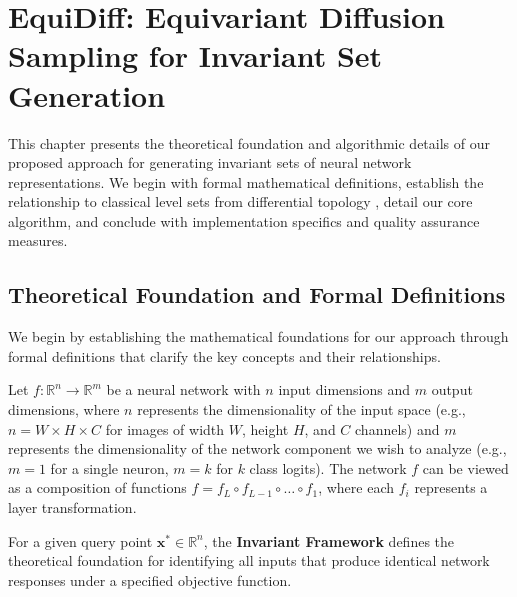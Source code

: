 \chapter{EquiDiff: Equivariant Diffusion Sampling for Invariant Set Generation}\label{r:method}

This chapter presents the theoretical foundation and algorithmic details of our proposed approach for generating invariant sets of neural network representations. We begin with formal mathematical definitions, establish the relationship to classical level sets from differential topology \citep{lee2013smooth,milnor1965topology,fort2017gaussian}, detail our core algorithm, and conclude with implementation specifics and quality assurance measures.

\section{Theoretical Foundation and Formal Definitions}

We begin by establishing the mathematical foundations for our approach through formal definitions that clarify the key concepts and their relationships.

\begin{defi}\label{def:invariants_framework}
Let $f: \mathbb{R}^n \rightarrow \mathbb{R}^m$ be a neural network with $n$ input dimensions and $m$ output dimensions, where $n$ represents the dimensionality of the input space (e.g., $n = W \times H \times C$ for images of width $W$, height $H$, and $C$ channels) and $m$ represents the dimensionality of the network component we wish to analyze (e.g., $m = 1$ for a single neuron, $m = k$ for $k$ class logits). The network $f$ can be viewed as a composition of functions $f = f_L \circ f_{L-1} \circ \ldots \circ f_1$, where each $f_i$ represents a layer transformation.

For a given query point $\mathbf{x}^* \in \mathbb{R}^n$, the \textbf{Invariant Framework} defines the theoretical foundation for identifying all inputs that produce identical network responses under a specified objective function.
\end{defi}

